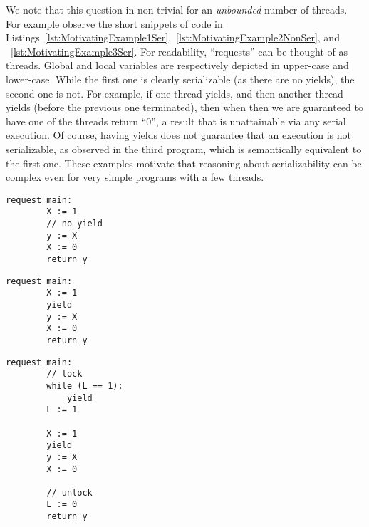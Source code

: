 %
We note that this question in non trivial for an \textit{unbounded} number of threads. For example observe the short snippets of code in Listings~\ref{lst:MotivatingExample1Ser},~\ref{lst:MotivatingExample2NonSer}, and ~\ref{lst:MotivatingExample3Ser}. For readability, ``requests'' can be thought of as threads. Global and local variables are respectively depicted in upper-case and lower-case.
While the first one is clearly serializable (as there are no yields), the second one is not. For example, if one thread yields, and then another thread yields (before the previous one terminated), then when then we are guaranteed to have one of the threads return ``0'', a result that is unattainable via any serial execution. Of course, having yields does not guarantee that an execution is not serializable, as observed in the third program, which is semantically equivalent to the first one.
These examples motivate that reasoning about serializability can be complex even for very simple programs with a few threads.
%


\noindent
\begin{minipage}[t]{0.45\textwidth}
	\begin{minipage}[t]{\textwidth}
		\begin{lstlisting}[caption={Without yield or lock (serializable)},
			label={lst:MotivatingExample1Ser}]
    request main: 
        X := 1 
        // no yield
        y := X 
        X := 0
        return y 
		\end{lstlisting}
	\end{minipage}
	\vspace{1em}
	\begin{minipage}[t]{\textwidth}
		\begin{lstlisting}[caption={With yield (not serializable)},
			label={lst:MotivatingExample2NonSer}]
    request main: 
        X := 1 
        yield 
        y := X 
        X := 0
        return y 	
		\end{lstlisting}
	\end{minipage}
\end{minipage}%
\hfill
\begin{minipage}[t]{0.45\textwidth}
	\begin{lstlisting}[caption={With yield and lock (serializable)},
		label={lst:MotivatingExample3Ser}]
    request main: 
        // lock
        while (L == 1): 
            yield
        L := 1 

        X := 1
        yield
        y := X 
        X := 0

        // unlock    
        L := 0
        return y 
	\end{lstlisting}
\end{minipage}



